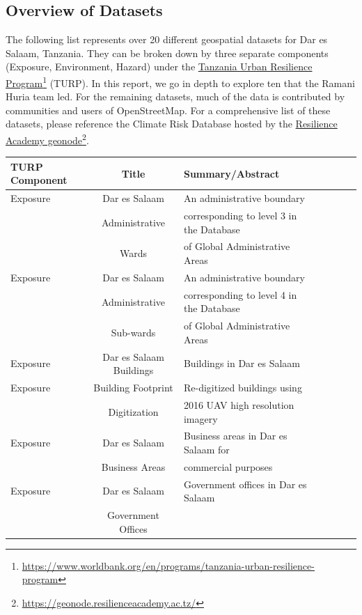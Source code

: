 \documentclass[a4paper,12pt,twoside]{article}
\begin{document}
\subsection{Overview of Datasets}
The following  list represents over 20 different geospatial datasets for Dar es Salaam, Tanzania. They can be broken down by three separate components (Exposure, Environment, Hazard) under the \href{https://www.worldbank.org/en/programs/tanzania-urban-resilience-program}{Tanzania Urban Resilience Program}\footnote{\url{https://www.worldbank.org/en/programs/tanzania-urban-resilience-program}} (TURP). In this report, we go in depth to explore ten that the Ramani Huria team led. For the remaining datasets, much of the data is contributed by communities and users of OpenStreetMap. 
For a comprehensive list of these datasets, please reference the Climate Risk Database hosted by the \href{https://geonode.resilienceacademy.ac.tz/}{Resilience Academy geonode}\footnote{\url{https://geonode.resilienceacademy.ac.tz/}}.

\begin{tabular}{|l|c|l|c|l|c|l|}
\hline
\bfseries TURP Component & \bfseries Title & \bfseries Summary/Abstract\\
\hline
Exposure & Dar es Salaam & An administrative boundary\\
{} & Administrative & corresponding to level 3 in the Database\\
{} & Wards & of Global Administrative Areas\\
\hline
Exposure & Dar es Salaam  & An administrative boundary \\
{} & Administrative & corresponding to level 4 in the Database\\
{} & Sub-wards & of Global Administrative Areas\\
\hline
Exposure & Dar es Salaam Buildings & Buildings in Dar es Salaam\\
\hline
Exposure & Building Footprint & Re-digitized buildings using\\
{} & Digitization  & 2016 UAV high resolution imagery\\
\hline
Exposure & Dar es Salaam & Business areas in Dar es Salaam for \\
{} & Business Areas & commercial purposes\\
\hline
Exposure & Dar es Salaam & Government offices in Dar es Salaam\\
{} & Government Offices & {}\\
\hline
\end{tabular}
\end{document}
